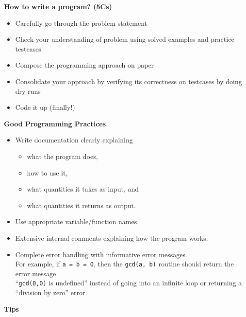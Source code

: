 \documentclass[../Problems]{subfiles}
\begin{document}
\begin{center}
	\textbf{\large{How to write a program? (5Cs)}}
\end{center}
\begin{itemize}
\item Carefully go through the problem statement
\item Check your understanding of problem using solved examples and practice testcases
\item Compose the programming approach on paper
\item Consolidate your approach by verifying its correctness on testcases by doing dry runs
\item Code it up (finally!)
\end{itemize}
\begin{center}
	\textbf{\large{Good Programming Practices}}
\end{center}
\begin{itemize}
\item 
Write documentation clearly explaining 
	\begin{itemize}
	\item what the program does,
	\item how to use it,
	\item what quantities it takes as input, and
	\item what quantities it returns as output.
	\end{itemize}
\item
Use appropriate variable/function names.
\item 
Extensive internal comments explaining how the program works.
\item 
Complete error handling with informative error messages.\\
For example, if \verb!a = b = 0!, then the \verb!gcd(a, b)! routine should return the error message \\``\verb!gcd(0,0)! is undefined'' instead of going into an infinite loop or returning a ``division by zero'' error.
\end{itemize}
\begin{center}
	\textbf{\large{Tips}}
\end{center}
\end{document}
